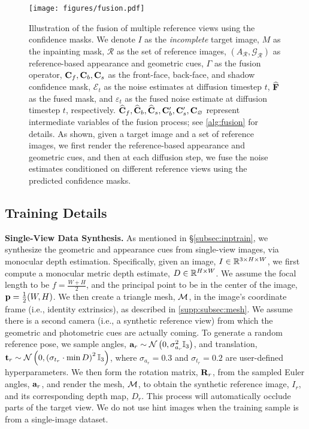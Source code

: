 \begin{figure*}[t]
    \centering
    \texttt{[image: figures/fusion.pdf]}
    \caption{Illustration of the fusion of multiple reference views using the confidence masks. We denote $I$ as the \emph{incomplete} target image, $M$ as the inpainting mask, $\mathcal{R}$ as the set of reference images, $(A_\mathcal{R}, \mathcal{G}_\mathcal{R})$ as reference-based appearance and geometric cues, $\Gamma$ as the fusion operator, $\mathbf{C}_f, \mathbf{C}_b, \mathbf{C}_s$ as the front-face, back-face, and shadow confidence mask, $\mathcal{E}_t$ as the noise estimates at diffusion timestep $t$, $\widehat{\mathbf{F}}$ as the fused mask, and $\varepsilon_t$ as the fused noise estimate at diffusion timestep $t$, respectively. $\widehat{\mathbf{C}}_f, \widehat{\mathbf{C}}_b, \widehat{\mathbf{C}}_s, \mathbf{C}'_b, \mathbf{C}'_s, \mathbf{C}_\varnothing$ represent intermediate variables of the fusion process; see \cref{alg:fusion} for details. As shown, given a target image and a set of reference images, we first render the reference-based appearance and geometric cues, and then at each diffusion step, we fuse the noise estimates conditioned on different reference views using the predicted confidence masks.}
    \label{fig:fusion}
\end{figure*}

\subsection{Training Details}
\label{supp:subsec:training}

\noindent\textbf{Single-View Data Synthesis.}
As mentioned in \S\ref{subsec:inptrain}, we synthesize the geometric and appearance cues from single-view images, via monocular depth estimation. Specifically, given an image, $I \in \mathbb{R}^{3 \times H \times W}$, we first compute a monocular metric depth estimate, $D \in \mathbb{R}^{H \times W}$. We assume the focal length to be $f = \frac{W + H}{2}$, and the principal point to be in the center of the image, $\mathbf{p} = \frac{1}{2} (W, H)$. We then create a triangle mesh, $\mathcal{M}$, in the image's coordinate frame (i.e., identity extrinsics), as described in \cref{supp:subsec:mesh}. We assume there is a second camera (i.e., a synthetic reference view) from which the geometric and photometric cues are actually coming. To generate a random reference pose, we sample angles, $\mathbf{a}_r \sim \mathcal{N}\left(0, \sigma_{a_r}^2 \mathbb{I}_3\right)$, and translation, $\mathbf{t}_r \sim \mathcal{N}\left(0, \left(\sigma_{t_r} \cdot \min D\right)^2 \mathbb{I}_3\right)$, where $\sigma_{a_r} = 0.3$ and $\sigma_{t_r} = 0.2$ are user-defined hyperparameters. We then form the rotation matrix, $\mathbf{R}_r$, from the sampled Euler angles, $\mathbf{a}_r$, and render the mesh, $\mathcal{M}$, to obtain the synthetic reference image, $I_r$, and its corresponding depth map, $D_r$. This process will automatically occlude parts of the target view. We do not use hint images when the training sample is from a single-image dataset.

